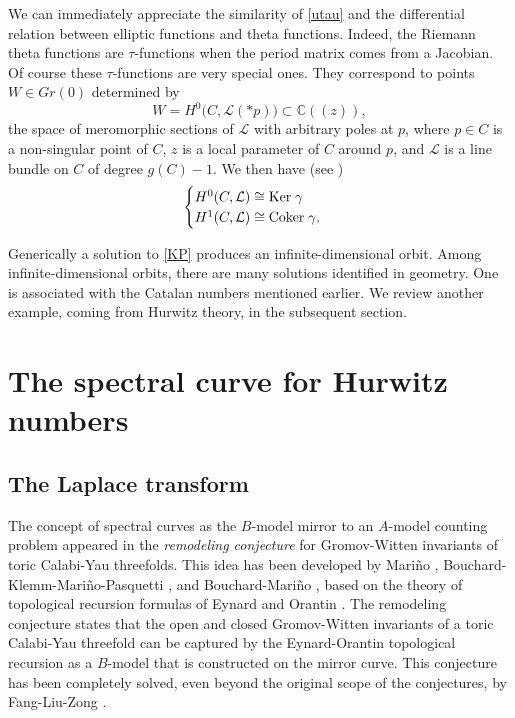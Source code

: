 \documentclass{amsart}
\theoremstyle{definition}
\numberwithin{equation}{section}
\numberwithin{figure}{section}
\def\isom{\cong}
\def\Ker{{\text{\rm{Ker}}}}
\def\Coker{{\text{\rm{Coker}}}}
\def\gam{\gamma}
\newcommand{\bC}{{\mathbb{C}}}
\newcommand{\cL}{{\mathcal{L}}}
\begin{document}
We can immediately appreciate the similarity of \eqref{utau} and
the differential relation between elliptic functions and theta functions. 
Indeed, the Riemann theta functions are $\tau$-functions when the
period matrix comes from a Jacobian. Of course these $\tau$-functions are
very special ones.  They correspond to points $W\in Gr(0)$ 
determined by
$$
W = H^0\big(C, \cL(*p)\big)\subset \bC((z)),
$$
the space of meromorphic sections of $\cL$ with arbitrary poles at
$p$,
where $p\in C$ is a non-singular point of $C$, $z$ is a local 
parameter of $C$ around $p$, and $\cL$ is a line bundle on $C$ of 
degree $g(C)-1$. We then have (see \cite[Lemma 3.7]{M1984a})
$$
\begin{cases}
H^0(C,\cL) \isom \Ker\; \gam\\
H^1(C, \cL) \isom \Coker\; \gam.
\end{cases}
$$



Generically a solution to \eqref{KP} 
produces an infinite-dimensional orbit. 
Among infinite-dimensional orbits, there are many solutions identified
in geometry. One is associated with the Catalan numbers mentioned earlier.
We  review another example, coming from Hurwitz theory, in the subsequent section.






\section{The spectral curve for Hurwitz numbers}
\label{sect:Hurwitz}


\subsection{The Laplace transform}
\label{subsect:Laplace}
The concept of spectral curves as the $B$-model mirror to an $A$-model
counting problem appeared 
in the \emph{remodeling
conjecture}
for Gromov-Witten invariants of toric Calabi-Yau threefolds. This idea has been developed 
 by Mari\~no \cite{Mar}, 
Bouchard-Klemm-Mari\~no-Pasquetti
\cite{BKMP}, and Bouchard-Mari\~no
\cite{BM}, based on the theory of topological recursion 
formulas of Eynard
and Orantin \cite{EO1}.
The remodeling conjecture 
states that the open and closed 
Gromov-Witten invariants of a toric Calabi-Yau
threefold can be  captured by the Eynard-Orantin
topological recursion as a $B$-model that is 
constructed on the mirror curve. This conjecture has been
completely solved, even beyond the original scope of the conjectures,
 by Fang-Liu-Zong
\cite{FLZ}.
\end{document}
